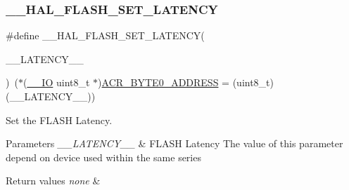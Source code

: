 \subsubsection{\texorpdfstring{\+\_\+\+\_\+\+H\+A\+L\+\_\+\+F\+L\+A\+S\+H\+\_\+\+S\+E\+T\+\_\+\+L\+A\+T\+E\+N\+CY}{\_\_HAL\_FLASH\_SET\_LATENCY}}
{\footnotesize\ttfamily \#define \+\_\+\+\_\+\+H\+A\+L\+\_\+\+F\+L\+A\+S\+H\+\_\+\+S\+E\+T\+\_\+\+L\+A\+T\+E\+N\+CY(\begin{DoxyParamCaption}\item[{}]{\+\_\+\+\_\+\+L\+A\+T\+E\+N\+C\+Y\+\_\+\+\_\+ }\end{DoxyParamCaption})~($\ast$(\mbox{\hyperlink{core__sc300_8h_aec43007d9998a0a0e01faede4133d6be}{\+\_\+\+\_\+\+IO}} uint8\+\_\+t $\ast$)\mbox{\hyperlink{group___f_l_a_s_h___private___constants_gaeaca61fbcff69df08100280868bff214}{A\+C\+R\+\_\+\+B\+Y\+T\+E0\+\_\+\+A\+D\+D\+R\+E\+SS}} = (uint8\+\_\+t)(\+\_\+\+\_\+\+L\+A\+T\+E\+N\+C\+Y\+\_\+\+\_\+))}



Set the F\+L\+A\+SH Latency. 


\begin{DoxyParams}{Parameters}
{\em \+\_\+\+\_\+\+L\+A\+T\+E\+N\+C\+Y\+\_\+\+\_\+} & F\+L\+A\+SH Latency The value of this parameter depend on device used within the same series \\
\hline
\end{DoxyParams}

\begin{DoxyRetVals}{Return values}
{\em none} & \\
\hline
\end{DoxyRetVals}
